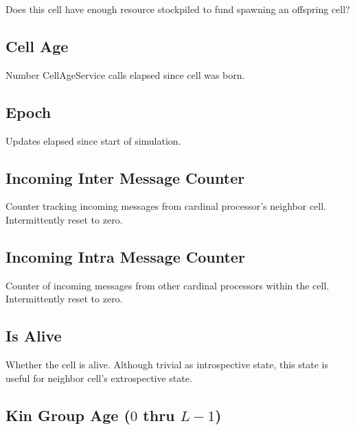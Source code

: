 
Does this cell have enough resource stockpiled to fund spawning an offspring cell?

\subsection{Cell Age}


Number CellAgeService calls elapsed since cell was born.

\subsection{Epoch}


Updates elapsed since start of simulation.

\subsection{Incoming Inter Message Counter}


Counter tracking incoming messages from cardinal processor's neighbor cell.
Intermittently reset to zero.

\subsection{Incoming Intra Message Counter}


Counter of incoming messages from other cardinal processors within the cell.
Intermittently reset to zero.

\subsection{Is Alive}


Whether the cell is alive.
Although trivial as introspective state, this state is useful for neighbor cell's extrospective state.

\subsection{Kin Group Age ($0$ thru $L - 1$)}

